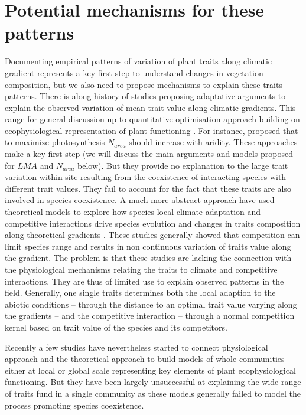 \documentclass[a4paper,11pt]{article}
\begin{document}
\clearpage

\section{Potential mechanisms for these patterns}

Documenting empirical patterns of variation of plant traits along climatic gradient represents a key first step to understand changes in vegetation composition, but we also need to propose mechanisms to explain these traits patterns. There is along history of studies proposing adaptative arguments to explain the observed variation of mean trait value along climatic gradients. This range for general discussion up to quantitative optimisation approach building on ecophysiological representation of plant functioning \citep{Makela-2002}. For instance, \citet{Wright-2003} proposed that to maximize photosynthesis $N_{area}$ should increase with aridity. These approaches make a key first step (we will discuss the main arguments and models proposed for $LMA$ and $N_{area}$ below). But they provide no explanation to the large trait variation within site resulting from the coexistence of interacting species with different trait values. They fail to account for the fact that these traits are also involved in species coexistence. A much more abstract approach have used theoretical models to explore how species local climate adaptation and competitive interactions drive species evolution and changes in traits composition along theoretical gradients \citep{Case-2000,Doebeli-2003,Goldberg-2006,Leimar-2008}. These studies generally showed that competition can limit species range and results in non continuous variation of traits value along the gradient. The problem is that these studies are lacking the connection with the physiological mechanisms relating the traits to climate and competitive interactions. They are thus of limited use to explain observed patterns in the field. Generally, one single traits determines both the local adaption to the abiotic conditions -- through the distance to an optimal trait value varying along the gradients -- and the competitive interaction -- through a normal competition kernel based on trait value of the species and its competitors\citep[see][]{Case-2000}.  

Recently a few studies have nevertheless started to connect physiological approach and the theoretical approach to build models of whole communities either at local \citep{Farrior-2013} or global scale \citep[see][]{Sakschewski-2015,Scheiter-2013} representing key elements of plant ecophysiological functioning. But they have been largely unsuccessful at explaining the wide range of traits fund in a single community as these models generally failed to model the process promoting species coexistence.
\end{document}
